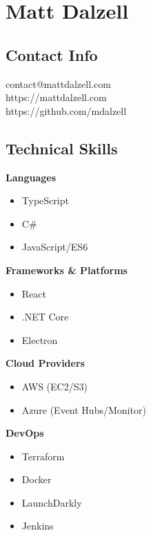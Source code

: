 \documentclass[12pt]{article}
\begin{document}

\section*{Matt Dalzell}

\setlength{\columnsep}{4em}
\setlength{\columnseprule}{0.1pt}
\begin{paracol}{2}

\subsection*{Contact Info}
contact@mattdalzell.com \\ 
https://mattdalzell.com \\
https://github.com/mdalzell 

\subsection*{Technical Skills} 

\textbf{Languages}
\begin{itemize}
    \setlength\itemsep{0em}
    \item {\footnotesize{TypeScript}}
    \item {\footnotesize{C\#}}
    \item {\footnotesize{JavaScript/ES6}}
\end{itemize}

\noindent \textbf{Frameworks \& Platforms}
\begin{itemize}
    \setlength\itemsep{0em}
    \item {\footnotesize{React}}
    \item {\footnotesize{.NET Core}}
    \item {\footnotesize{Electron}}
\end{itemize}

\noindent \textbf{Cloud Providers}
\begin{itemize}
    \setlength\itemsep{0em}
    \item {\footnotesize{AWS (EC2/S3)}}
    \item {\footnotesize{Azure (Event Hubs/Monitor)}}
\end{itemize}

\noindent \textbf{DevOps}
\begin{itemize}
    \setlength\itemsep{0em}
    \item {\footnotesize{Terraform}}
    \item {\footnotesize{Docker}}
    \item {\footnotesize{LaunchDarkly}}
    \item {\footnotesize{Jenkins}}
\end{itemize}


\end{paracol}
\end{document}
